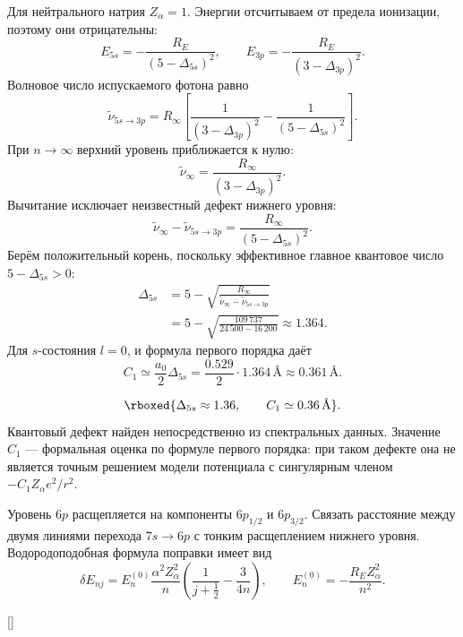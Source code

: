\documentclass[../final.tex]{subfiles}
\begin{document}
\solution
Для нейтрального натрия $Z_{\alpha}=1$. Энергии отсчитываем от
предела ионизации, поэтому они отрицательны:
\[
    E_{5s}=-\frac{R_E}{(5-\Delta_{5s})^2},\qquad
    E_{3p}=-\frac{R_E}{(3-\Delta_{3p})^2}.
\]
Волновое число испускаемого фотона равно
\[
    \widetilde\nu_{5s\to3p}
    =R_\infty\left[\frac1{(3-\Delta_{3p})^2}
                    -\frac1{(5-\Delta_{5s})^2}\right].
\]
При $n\to\infty$ верхний уровень приближается к нулю:
\[
    \widetilde\nu_\infty
    =\frac{R_\infty}{(3-\Delta_{3p})^2}.
\]
Вычитание исключает неизвестный дефект нижнего уровня:
\[
    \widetilde\nu_\infty-\widetilde\nu_{5s\to3p}
       =\frac{R_\infty}{(5-\Delta_{5s})^2}.
\]
Берём положительный корень, поскольку эффективное главное квантовое
число $5-\Delta_{5s}>0$:
\begin{align*}
    \Delta_{5s}
    &=5-\sqrt{\frac{R_\infty}
          {\widetilde\nu_\infty-\widetilde\nu_{5s\to3p}}}\\
    &=5-\sqrt{\frac{109\,737}{24\,500-16\,200}}
      \approx1.364.
\end{align*}
Для $s$-состояния $l=0$, и формула первого порядка даёт
\[
    C_1\simeq\frac{a_0}{2}\Delta_{5s}
       =\frac{0.529}{2}\cdot1.364\,\text{\AA}
       \approx0.361\,\text{\AA}.
\]

\answer
\[
    \rboxed{\Delta_{5s}\approx1.36,\qquad
            C_1\simeq0.36\,\text{\AA}}.
\]
Квантовый дефект найден непосредственно из спектральных данных.
Значение $C_1$ --- формальная оценка по формуле первого порядка:
при таком дефекте она не является точным решением модели потенциала
с сингулярным членом $-C_1Z_{\alpha}e^2/r^2$.


\condition
Уровень $6p$ расщепляется на компоненты $6p_{1/2}$ и $6p_{3/2}$.
Связать расстояние между двумя линиями перехода $7s\to6p$
с тонким расщеплением нижнего уровня.
Водородоподобная формула поправки имеет вид
\[
    \delta E_{nj}
    =E_n^{(0)}\frac{\alpha^2Z_{\alpha}^2}{n}
      \left(\frac1{j+\tfrac12}-\frac3{4n}\right),\qquad
    E_n^{(0)}=-\frac{R_EZ_{\alpha}^2}{n^2}.
\]

\solution

\begin{rbox}[unbreakable,left=12pt,right=12pt,top=12pt,bottom=10pt]{[]}
\centering
{}
\end{rbox}
\end{document}
